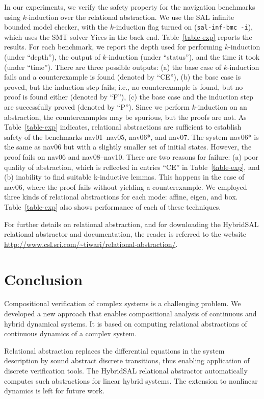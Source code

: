 \documentclass{article}
\begin{document}
In our experiments, we verify the safety property for the navigation
benchmarks using $k$-induction over the relational abstraction.  We
use the SAL infinite bounded model checker, with the $k$-induction
flag turned on ({\tt{sal-inf-bmc -i}}), which uses the SMT solver
Yices in the back end.  Table~\ref{table-exp} reports the results. For
each benchmark, we report the depth used for performing $k$-induction
(under ``depth''), the output of $k$-induction (under ``status''), and
the time it took (under ``time'').  There are three possible outputs:
(a) the base case of $k$-induction fails and a counterexample is
found (denoted by ``CE''), (b) the base case is proved, but the
induction step fails; i.e., no counterexample is found, but no proof
is found either (denoted by ``F''), (c) the base case and the induction
step are successfully proved (denoted by ``P''). Since we perform
$k$-induction on an abstraction, the counterexamples may be spurious,
but the proofs are not.  As Table~\ref{table-exp} indicates,
relational abstractions are sufficient to establish safety of the
benchmarks nav01--nav05, nav06*, and nav07.  The system nav06* is the
same as nav06 but with a slightly smaller set of initial states.
However, the proof fails on nav06 and nav08--nav10.  There are two
reasons for failure: (a) poor quality of abstraction, which is
reflected in entries ``CE'' in Table~\ref{table-exp},  and (b) inability
to find suitable k-inductive lemmas. This happens in the case of
nav06, where the proof fails without yielding a counterexample.  
We employed three kinds of relational abstractions for each mode:
affine, eigen, and box.  Table~\ref{table-exp} also shows
performance of each of these techniques.
 
For further details on relational abstraction, and for downloading
the HybridSAL relational abstractor and documentation, the reader
is referred to the website
{{\url{http://www.csl.sri.com/~tiwari/relational-abstraction/}}}.


\section{Conclusion}

Compositional verification of complex systems is a
challenging problem.  We developed a new approach
that enables compositional analysis of continuous and
hybrid dynamical systems.  It is based on computing 
relational abstractions of continuous dynamics of
a complex system.

Relational abstraction replaces the differential equations 
in the system description by sound abstract discrete 
transitions, thus enabling application of discrete verification 
tools. The HybridSAL relational abstractor automatically 
computes such abstractions for linear hybrid systems. 
The extension to nonlinear dynamics is left for future
work.
\end{document}
